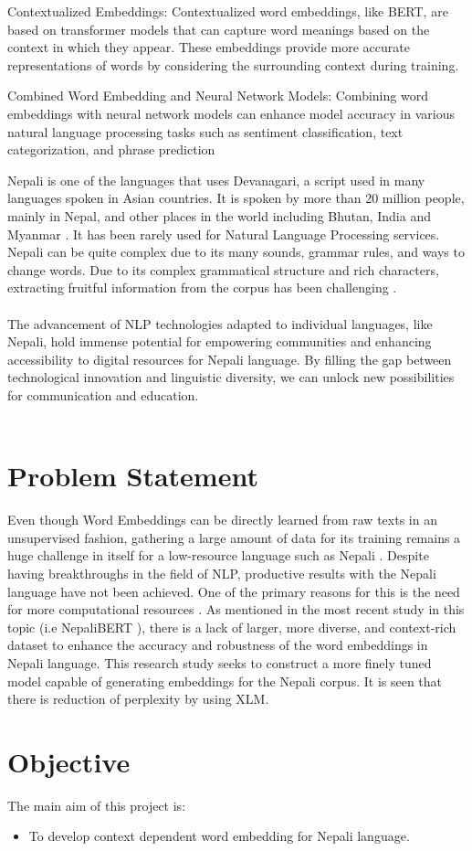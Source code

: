     Contextualized Embeddings:
        Contextualized word embeddings, like BERT, are based on transformer models that can capture word meanings based on the context in which they appear.
        These embeddings provide more accurate representations of words by considering the surrounding context during training.

    Combined Word Embedding and Neural Network Models:
        Combining word embeddings with neural network models can enhance model accuracy in various natural language processing tasks such as sentiment classification, text categorization, and phrase prediction \cite{reviewOnWordEmbedding}



        Nepali is one of the languages that uses Devanagari, a script used in many languages spoken in Asian countries. It is spoken by more than 20 million people, mainly in Nepal, and other places in the world including Bhutan, India and Myanmar \cite{niraula2020linguistic}.  It has been rarely used for Natural Language Processing services.  Nepali can be quite complex due to its many sounds, grammar rules, and ways to change words. Due to its complex grammatical structure and rich characters, extracting fruitful information from the corpus has been challenging \cite{NepaliBERT}.\\\\
        The advancement of NLP technologies adapted to individual languages, like Nepali, hold immense potential for empowering communities and enhancing accessibility to digital resources for Nepali language. By filling the gap between technological innovation and linguistic diversity, we can unlock new possibilities for communication and education.\\\\
        \section{Problem Statement} 
        Even though Word Embeddings can be directly learned from raw texts in an unsupervised fashion, gathering a large amount of data for its training remains a huge challenge in itself for a low-resource language such as Nepali \cite{koirala-niraula-2021-npvec1}. Despite having breakthroughs in the field of NLP, productive results with the Nepali language have not been achieved. One of the primary reasons for this is the need for more computational resources \cite{NepaliBERT}. As mentioned in the most recent study in this topic (i.e NepaliBERT \cite{NepaliBERT}), there is a lack of larger, more diverse, and context-rich dataset to enhance the accuracy and robustness of the word embeddings in Nepali language. This research study seeks to construct a more finely tuned model capable of generating embeddings for the Nepali corpus. It is seen that there is reduction of perplexity by using XLM.
        \section{Objective}
            The main aim of this project is:
            \begin{itemize}
                \item To develop context dependent word embedding for Nepali language.
            \end{itemize}
